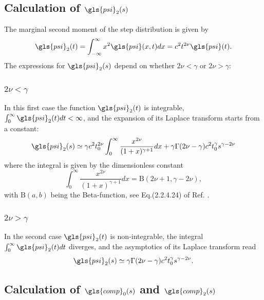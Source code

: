 \subsection{Calculation of $\gls{psi}_2(s)$}
The marginal second moment of the step distribution is given by  
\begin{align}
 \gls{psi}_2(t) = \int_{-\infty}^\infty x^2 \gls{psi}(x,t) dx = c^2 t^{2 \nu} \gls{psi}(t).
\end{align}
The expressions for $\gls{psi}_2(s)$ depend on whether $2 \nu < \gamma $ or $2 \nu > \gamma$:

\subsubsection{$2\nu<\gamma$} 
In this first case the function $\gls{psi}_2(t)$ is integrable, $\int_0^\infty \gls{psi}_2(t) dt < \infty$, and the expansion 
of its Laplace transform starts from a constant:
\begin{equation}
 \gls{psi}_2(s) \simeq \gamma c^2 t_0^{2\nu}  \int_0^\infty \frac{x^{2\nu}}{(1+x)^{\gamma+1}} dx  + \gamma \Gamma(2\nu-\gamma) c^2t_0^\gamma s^{\gamma-2\nu} \label{eqn:psi2NuSmall}
\end{equation}
where the integral is given by the dimensionless constant 
\begin{equation}
 \int_0^\infty \frac{x^{2\nu}}{(1+x)^{\gamma+1}} dx = \mathrm{B}(2\nu+1,\gamma-2\nu), \label{eqn:I1}
\end{equation}
with $\mathrm{B}(a,b)$ being the Beta-function, see Eq.(2.2.4.24) of Ref. \cite{BryPr}.  

\subsubsection{$2\nu>\gamma$} 
In the second case $\gls{psi}_2(t)$ is non-integrable, the integral $\int_0^\infty \gls{psi}_2(t) dt$ diverges, and the asymptotics of its Laplace transform read
\begin{align}
 \gls{psi}_2(s) \simeq \gamma \Gamma(2\nu-\gamma) c^2  t_0^\gamma s^{\gamma-2\nu}. \label{eqn:psi2NuBig}
\end{align}

\subsection{Calculation of $\gls{comp}_0(s)$ and $\gls{comp}_2(s)$}

